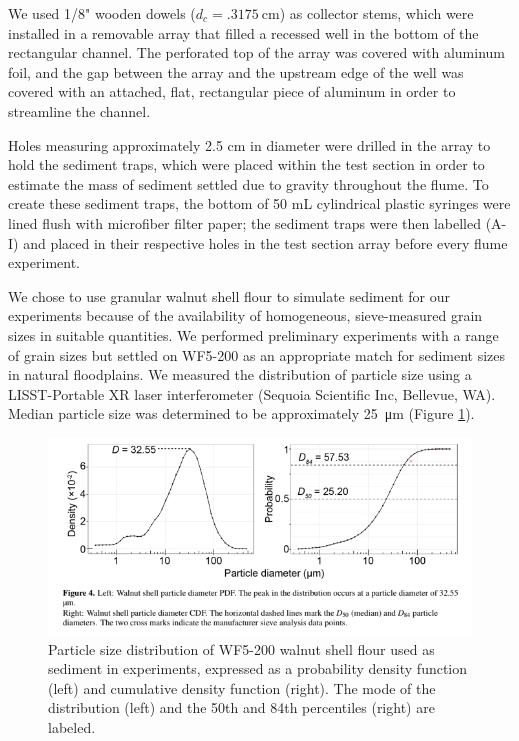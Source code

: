 \documentclass{scrreprt}
\begin{document}
We used 1/8" wooden dowels ($d_c = \SI{.3175}{\centi\metre}$) as collector stems, which were installed in a removable array that filled a recessed well in the bottom of the rectangular channel. The perforated top of the array was covered with aluminum foil, and the gap between the array and the upstream edge of the well was covered with an attached, flat, rectangular piece of aluminum in order to streamline the channel. 

Holes measuring approximately 2.5 cm in diameter were drilled in the array to hold the sediment traps, which were placed within the test section in order to estimate the mass of sediment settled due to gravity throughout the flume. To create these sediment traps, the bottom of 50 mL cylindrical plastic syringes were lined flush with microfiber filter paper; the sediment traps were then labelled (A-I) and placed in their respective holes in the test section array before every flume experiment. 

We chose to use granular walnut shell flour to simulate sediment for our experiments because of the availability of homogeneous, sieve-measured grain sizes in suitable quantities. We performed preliminary experiments with a range of grain sizes but settled on WF5-200 as an appropriate match for sediment sizes in natural floodplains. We measured the distribution of particle size using a LISST-Portable XR laser interferometer (Sequoia Scientific Inc, Bellevue, WA). Median particle size was determined to be approximately \SI{25}{\micro\metre} (Figure \ref{fig:sedsize}).

\begin{figure}[htbp]
\includegraphics[width=15cm,trim = {0 3cm 0 0},clip] {wf5-200sizedist.png}
\centering
\caption{Particle size distribution of WF5-200 walnut shell flour used as sediment in experiments, expressed as a probability density function (left) and cumulative density function (right). The mode of the distribution (left) and the 50th and 84th percentiles (right) are labeled.} %
\label{fig:sedsize}
\end{figure}
\end{document}
